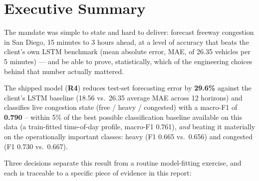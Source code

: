 \documentclass[11pt]{article}
\begin{document}
\tableofcontents
\thispagestyle{empty}
\clearpage

\section{Executive Summary}

The mandate was simple to state and hard to deliver: forecast freeway congestion in San Diego,
15 minutes to 3 hours ahead, at a level of accuracy that beats the client's own LSTM benchmark
(mean absolute error, MAE, of 26.35 vehicles per 5 minutes) --- and be able to prove, statistically,
which of the engineering choices behind that number actually mattered.

\begin{finding}
The shipped model (\textbf{R4}) reduces test-set forecasting error by \textbf{29.6\%} against the
client's LSTM baseline (18.56 vs.\ 26.35 average MAE across 12 horizons) and classifies live
congestion state (free / heavy / congested) with a macro-F1 of \textbf{0.790} -- within 5\% of the
best possible classification baseline available on this data (a train-fitted time-of-day profile,
macro-F1 0.761), \emph{and} beating it materially on the operationally important classes: heavy
(F1 0.665 vs.\ 0.656) and congested (F1 0.730 vs.\ 0.667).
\end{finding}

Three decisions separate this result from a routine model-fitting exercise, and each is
traceable to a specific piece of evidence in this report:
\end{document}
